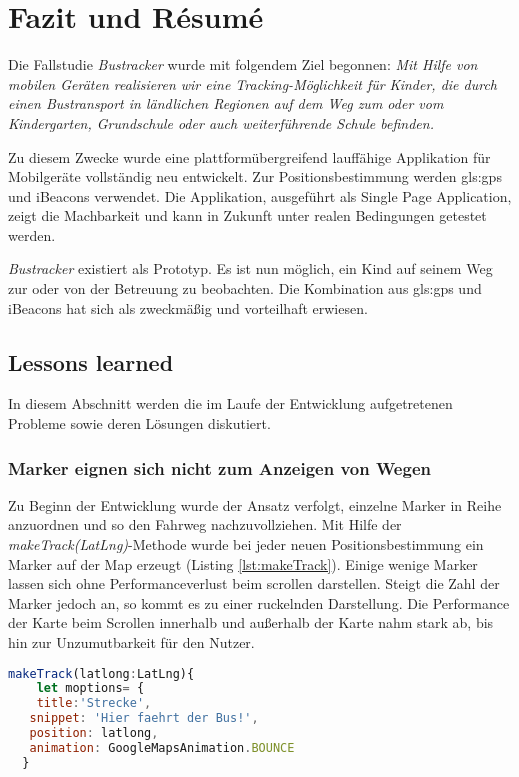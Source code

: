 \chapter{Fazit und R\'{e}sum\'{e}}
\label{Fazit und R\'{e}sum\'{e}}

Die Fallstudie \emph{Bustracker} wurde mit folgendem Ziel begonnen: \glqq \emph{Mit Hilfe von mobilen Geräten realisieren wir eine Tracking-Möglichkeit für Kinder, die durch einen Bustransport in ländlichen Regionen auf dem Weg zum oder vom Kindergarten, Grundschule oder auch weiterführende Schule befinden.}\grqq{}

Zu diesem Zwecke wurde eine plattformübergreifend lauffähige Applikation für Mobilgeräte vollständig neu entwickelt. Zur Positionsbestimmung werden \gls{gls:gps} und iBeacons verwendet. Die Applikation, ausgeführt als Single Page Application, zeigt die Machbarkeit und kann in Zukunft unter realen Bedingungen getestet werden. 
 
\emph{Bustracker} existiert als Prototyp. Es ist nun möglich, ein Kind auf seinem Weg zur oder von der Betreuung zu beobachten. Die Kombination aus \gls{gls:gps} und iBeacons hat sich als zweckmäßig und vorteilhaft erwiesen. 


\section{Lessons learned}
\label{Lessons learned}

In diesem Abschnitt werden die  im Laufe der Entwicklung aufgetretenen Probleme sowie deren Lösungen diskutiert.  

\subsection{Marker eignen sich nicht zum Anzeigen von Wegen}
Zu Beginn der Entwicklung wurde der Ansatz verfolgt, einzelne Marker in Reihe anzuordnen und so den Fahrweg nachzuvollziehen. Mit Hilfe der \emph{makeTrack(LatLng)}-Methode wurde bei jeder neuen Positionsbestimmung ein Marker auf der Map erzeugt (Listing \ref{lst:makeTrack}). Einige wenige Marker lassen sich ohne Performanceverlust beim scrollen darstellen. Steigt die Zahl der Marker jedoch an, so kommt es zu einer ruckelnden Darstellung. Die Performance der Karte beim Scrollen innerhalb und außerhalb der Karte nahm stark ab, bis hin zur Unzumutbarkeit für den Nutzer.

\begin{lstlisting}[float, language= JavaScript, caption= Erstellen einzelner Marker, label=lst:makeTrack]
  makeTrack(latlong:LatLng){
    let moptions= {
    title:'Strecke',
   snippet: 'Hier faehrt der Bus!',
   position: latlong,
   animation: GoogleMapsAnimation.BOUNCE
  } 
\end{lstlisting}


